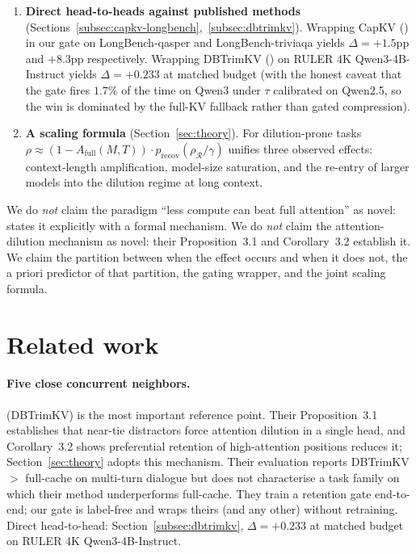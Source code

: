 \documentclass{article} %
\begin{document}
\begin{enumerate}
  show the wrapper also helps on Llama-family models, though there part of the
  gain comes from conservative gate-closing rather than a correctly recovered
  partition (Section~\ref{sec:limitations}).
  \item \textbf{Direct head-to-heads against published methods}
  (Sections~\ref{subsec:capkv-longbench},~\ref{subsec:dbtrimkv}). Wrapping
  CapKV (\citealp{arxiv260425975}) in our gate on LongBench-qasper and
  LongBench-triviaqa yields $\Delta = +1.5$pp and $+8.3$pp respectively.
  Wrapping DBTrimKV (\citealp{arxiv260509649}) on RULER 4K Qwen3-4B-Instruct
  yields $\Delta = +0.233$ at matched budget (with the honest caveat that the
  gate fires $1.7\%$ of the time on Qwen3 under $\tau$ calibrated on Qwen2.5,
  so the win is dominated by the full-KV fallback rather than gated
  compression).
  \item \textbf{A scaling formula} (Section~\ref{sec:theory}). For
  dilution-prone tasks $\rho \approx (1 - A_{\mathrm{full}}(M, T)) \cdot
  p_{\mathrm{recov}}(\rho_{\mathcal{R}}/\gamma)$ unifies three observed effects:
  context-length amplification, model-size saturation, and the re-entry of larger
  models into the dilution regime at long context.
\end{enumerate}

We do \emph{not} claim the paradigm ``less compute can beat full attention''
as novel: \citet{arxiv260509649} states it explicitly with a formal mechanism. We
do \emph{not} claim the attention-dilution mechanism as novel: their Proposition~3.1
and Corollary~3.2 establish it. We claim the partition between when the effect
occurs and when it does not, the a priori predictor of that partition, the gating
wrapper, and the joint scaling formula.

\section{Related work}
\label{sec:related}

\paragraph{Five close concurrent neighbors.}

\citet{arxiv260509649} (DBTrimKV) is the most important reference point.
Their Proposition~3.1 establishes that near-tie distractors force attention
dilution in a single head, and Corollary~3.2 shows preferential retention of
high-attention positions reduces it; Section~\ref{sec:theory} adopts this
mechanism. Their evaluation reports DBTrimKV $>$ full-cache on multi-turn
dialogue but does not characterise a task family on which their method
underperforms full-cache. They train a retention gate end-to-end; our gate is
label-free and wraps theirs (and any other) without retraining. Direct
head-to-head: Section~\ref{subsec:dbtrimkv}, $\Delta = +0.233$ at matched
budget on RULER 4K Qwen3-4B-Instruct.
\end{document}
